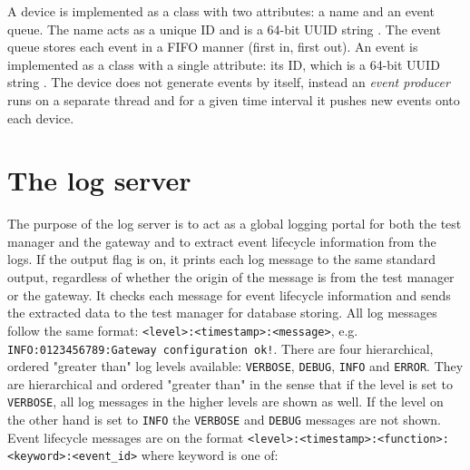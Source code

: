 
A device is implemented as a class with two attributes: a name and an event
queue. The name acts as a unique ID and is a 64-bit UUID string . The event queue stores each event in a FIFO manner (first in, first
out). An event is implemented as a class with a single attribute: its ID, which
is a 64-bit UUID string . The device does not generate
events by itself, instead an \textit{event producer} runs on a separate thread
and for a given time interval it pushes new events onto each device.

\section{The log server}

The purpose of the log server is to act as a global logging portal for both the
test manager and the gateway and to extract event lifecycle information from
the logs. If the output flag is on, it prints each log message to the same
standard output, regardless of whether the origin of the message is from the
test manager or the gateway. It checks each message for event lifecycle
information and sends the extracted data to the test manager for database
storing. All log messages follow the same format:
\texttt{<level>:<timestamp>:<message>}, e.g. \texttt{INFO:0123456789:Gateway
configuration ok!}. There are four hierarchical, ordered "greater than" log
levels available: \texttt{VERBOSE}, \texttt{DEBUG}, \texttt{INFO} and
\texttt{ERROR}. They are hierarchical and ordered "greater than" in the sense
that if the level is set to \texttt{VERBOSE}, all log messages in the higher
levels are shown as well. If the level on the other hand is set to
\texttt{INFO} the \texttt{VERBOSE} and \texttt{DEBUG} messages are not shown.
Event lifecycle messages are on the format
\texttt{<level>:<timestamp>:<function>:<keyword>:<event\_id>} where keyword is
one of:

